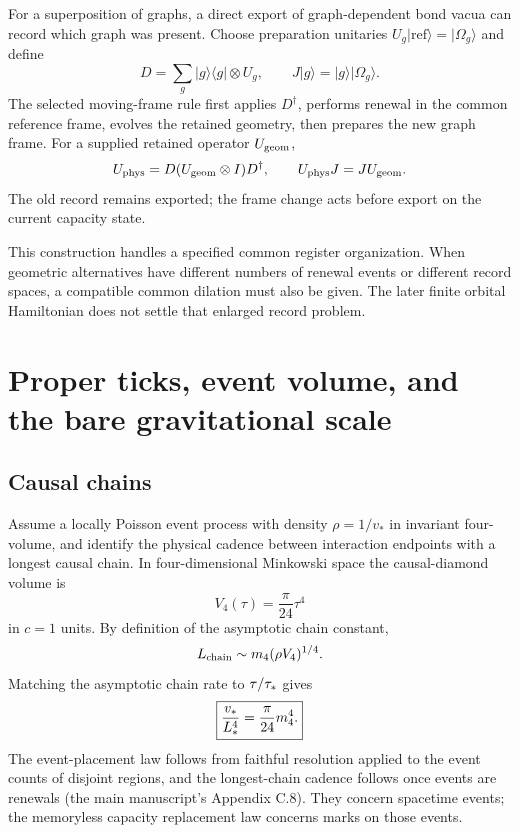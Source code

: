 For a superposition of graphs, a direct export of graph-dependent bond vacua can record which graph was present. Choose preparation unitaries $U_g|\mathrm{ref}\rangle=|\Omega_g\rangle$ and define
\begin{equation}
D=\sum_g|g\rangle\langle g|\otimes U_g,\qquad
J|g\rangle=|g\rangle|\Omega_g\rangle.
\end{equation}
The selected moving-frame rule first applies $D^\dagger$, performs renewal in the common reference frame, evolves the retained geometry, then prepares the new graph frame. For a supplied retained operator $U_{\rm geom}$,
\begin{equation}
U_{\rm phys}=D(U_{\rm geom}\otimes I)D^\dagger,\qquad
U_{\rm phys}J=JU_{\rm geom}.
\label{eq:frame}
\end{equation}
The old record remains exported; the frame change acts before export on the current capacity state.

This construction handles a specified common register organization. When geometric alternatives have different numbers of renewal events or different record spaces, a compatible common dilation must also be given. The later finite orbital Hamiltonian does not settle that enlarged record problem.

\section{Proper ticks, event volume, and the bare gravitational scale}
\label{sec:scale}

\subsection{Causal chains}

Assume a locally Poisson event process with density $\rho=1/v_*$ in invariant four-volume, and identify the physical cadence between interaction endpoints with a longest causal chain. In four-dimensional Minkowski space the causal-diamond volume is
\begin{equation}
V_4(\tau)=\frac{\pi}{24}\tau^4
\end{equation}
in $c=1$ units. By definition of the asymptotic chain constant,
\begin{equation}
L_{\rm chain}\sim m_4(\rho V_4)^{1/4}.
\end{equation}
Matching the asymptotic chain rate to $\tau/\tau_*$ gives
\begin{equation}
\boxed{\frac{v_*}{L_*^4}=\frac{\pi}{24}m_4^4.}
\label{eq:eventvol}
\end{equation}
The event-placement law follows from faithful resolution applied to the event counts of disjoint regions, and the longest-chain cadence follows once events are renewals (the main manuscript's Appendix C.8). They concern spacetime events; the memoryless capacity replacement law concerns marks on those events.

